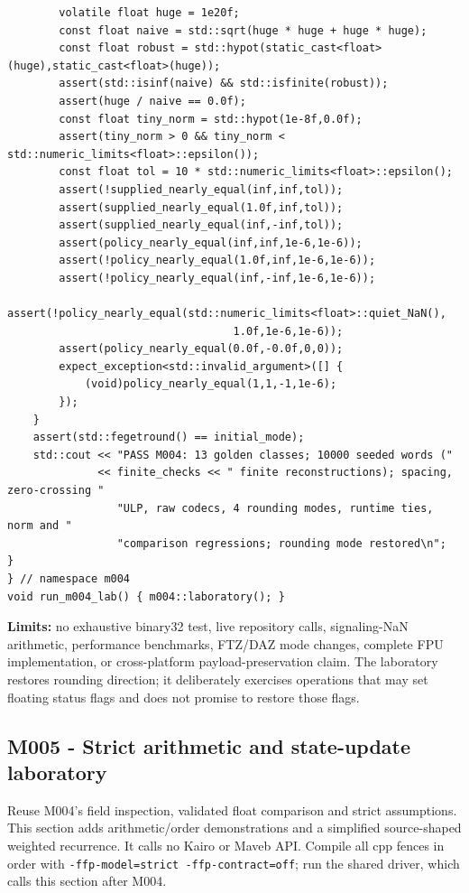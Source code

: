\begin{verbatim}
        volatile float huge = 1e20f;
        const float naive = std::sqrt(huge * huge + huge * huge);
        const float robust = std::hypot(static_cast<float>(huge),static_cast<float>(huge));
        assert(std::isinf(naive) && std::isfinite(robust));
        assert(huge / naive == 0.0f);
        const float tiny_norm = std::hypot(1e-8f,0.0f);
        assert(tiny_norm > 0 && tiny_norm < std::numeric_limits<float>::epsilon());
        const float tol = 10 * std::numeric_limits<float>::epsilon();
        assert(!supplied_nearly_equal(inf,inf,tol));
        assert(supplied_nearly_equal(1.0f,inf,tol));
        assert(supplied_nearly_equal(inf,-inf,tol));
        assert(policy_nearly_equal(inf,inf,1e-6,1e-6));
        assert(!policy_nearly_equal(1.0f,inf,1e-6,1e-6));
        assert(!policy_nearly_equal(inf,-inf,1e-6,1e-6));
        assert(!policy_nearly_equal(std::numeric_limits<float>::quiet_NaN(),
                                   1.0f,1e-6,1e-6));
        assert(policy_nearly_equal(0.0f,-0.0f,0,0));
        expect_exception<std::invalid_argument>([] {
            (void)policy_nearly_equal(1,1,-1,1e-6);
        });
    }
    assert(std::fegetround() == initial_mode);
    std::cout << "PASS M004: 13 golden classes; 10000 seeded words ("
              << finite_checks << " finite reconstructions); spacing, zero-crossing "
                 "ULP, raw codecs, 4 rounding modes, runtime ties, norm and "
                 "comparison regressions; rounding mode restored\n";
}
} // namespace m004
void run_m004_lab() { m004::laboratory(); }
\end{verbatim}

\textbf{Limits:} no exhaustive binary32 test, live repository calls, signaling-NaN arithmetic, performance benchmarks, FTZ/DAZ mode changes, complete FPU implementation, or cross-platform payload-preservation claim. The laboratory restores rounding direction; it deliberately exercises operations that may set floating status flags and does not promise to restore those flags.

\subsection{M005 - Strict arithmetic and state-update laboratory}\label{appendix-4e2236f53445-m005---strict-arithmetic-and-state-update-laboratory}

Reuse M004's field inspection, validated float comparison and strict assumptions. This section adds arithmetic/order demonstrations and a simplified source-shaped weighted recurrence. It calls no Kairo or Maveb API. Compile all cpp fences in order with \texttt{-ffp-model=strict\ -ffp-contract=off}; run the shared driver, which calls this section after M004.

